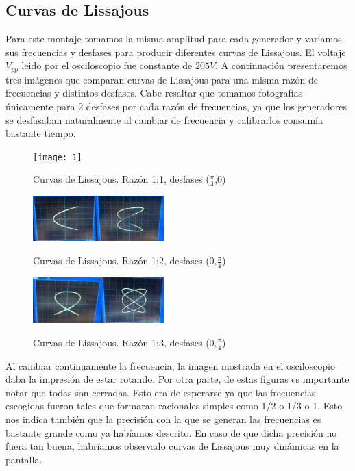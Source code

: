 \documentclass[%
 reprint,
 amsmath,amssymb,
 aps,
]{revtex4-1}
\begin{document}
\subsection{\label{sec:level2}Curvas de Lissajous}
Para este montaje tomamos la misma amplitud para cada generador y variamos sus frecuencias y desfases para producir diferentes curvas de Lissajous. El voltaje $V_{pp}$ leido por el osciloscopio fue constante de $205V$. A continuación presentaremos tres imágenes que comparan curvas de Lissajous para una misma razón de frecuencias y distintos desfases. Cabe resaltar que tomamos fotografías únicamente para 2 desfases por cada razón de frecuencias, ya que los generadores se desfasaban naturalmente al cambiar de frecuencia y calibrarlos consumía bastante tiempo.\\

\begin{figure}[h!]
\caption{ Curvas de Lissajous. Razón 1:1, desfases ($\frac{\pi}{4}$,0) }
\centering
\texttt{[image: 1]}
\label{fig:amortiguado}
\end{figure}

\begin{figure}[h!]
\caption{ Curvas de Lissajous. Razón 1:2, desfases (0,$\frac{\pi}{4}$) }
\centering
\includegraphics[width=0.45\textwidth]{2}
\label{fig:amortiguado}
\end{figure}

\begin{figure}[h!]
\caption{ Curvas de Lissajous. Razón 1:3, desfases (0,$\frac{\pi}{4}$) }
\centering
\includegraphics[width=0.45\textwidth]{3}
\label{fig:amortiguado}
\end{figure}

Al cambiar contínuamente la frecuencia, la imagen mostrada en el osciloscopio daba la impresión de estar rotando. Por otra parte, de estas figuras es importante notar que todas son cerradas. Esto era de esperarse ya que las frecuencias escogidas fueron tales que formaran racionales simples como 1/2 o 1/3 o 1. Esto nos indica también que la precisión con la que se generan las frecuencias es bastante grande como ya habíamos descrito. En caso de que dicha precisión no fuera tan buena, habríamos observado curvas de Lissajous muy dinámicas en la pantalla.\\
\end{document}
